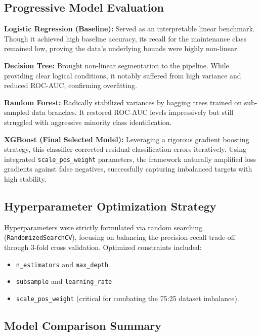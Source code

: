\documentclass[12pt, a4paper]{article}
\begin{document}
\subsection{Progressive Model Evaluation}

\textbf{Logistic Regression (Baseline):} Served as an interpretable linear benchmark. Though it achieved high baseline accuracy, its recall for the maintenance class remained low, proving the data's underlying bounds were highly non-linear.

\textbf{Decision Tree:} Brought non-linear segmentation to the pipeline. While providing clear logical conditions, it notably suffered from high variance and reduced ROC-AUC, confirming overfitting.

\textbf{Random Forest:} Radically stabilized variances by bagging trees trained on sub-sampled data branches. It restored ROC-AUC levels impressively but still struggled with aggressive minority class identification.

\textbf{XGBoost (Final Selected Model):} Leveraging a rigorous gradient boosting strategy, this classifier corrected residual classification errors iteratively. Using integrated \texttt{scale\_pos\_weight} parameters, the framework naturally amplified loss gradients against false negatives, successfully capturing imbalanced targets with high stability.

\subsection{Hyperparameter Optimization Strategy}

Hyperparameters were strictly formulated via random searching (\texttt{RandomizedSearchCV}), focusing on balancing the precision-recall trade-off through 3-fold cross validation. 
Optimized constraints included:
\begin{itemize}
    \item \texttt{n\_estimators} and \texttt{max\_depth}
    \item \texttt{subsample} and \texttt{learning\_rate}
    \item \texttt{scale\_pos\_weight} (critical for combating the 75:25 dataset imbalance).
\end{itemize}

\subsection{Model Comparison Summary}
\end{document}
